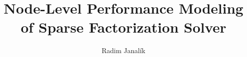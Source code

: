 \documentclass[]{usiinfdocprop}
\author{Radim Janal\'ik}
\title{Node-Level Performance Modeling \\of Sparse Factorization Solver}
\newcommand{\todol}[1]{\textbf{\textcolor{red}{[[#1]]}}}
\begin{document}
\maketitle
\frontmatter
\tableofcontents
\mainmatter

%
%







%
%

\end{document}

